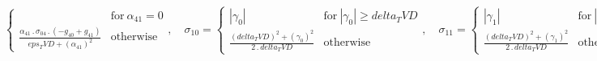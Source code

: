 \documentclass{article}
\begin{document}
\begin{dmath}
\begin{cases}
& \text{for}\: \alpha_{41} = 0 \\\frac{\alpha_{41} \,.\, \sigma_{0 4} \,.\, \left(- g_{40} + g_{41}\right)}{eps_TVD + \left(\alpha_{41} \right)^{2}} & \text{otherwise} \end{cases}, \quad \sigma_{1 0} = \begin{cases} \left|{\gamma_{0}}\right| & 
\text{for}\: \left|{\gamma_{0}}\right| \geq delta_TVD \\\frac{\left(delta_TVD \right)^{2} + \left(\gamma_{0} \right)^{2}}{2 \,.\, delta_TVD} & \text{otherwise} \end{cases}, \quad \sigma_{1 1} = \begin{cases} \left|{\gamma_{1}}\right| & \text{for}\: 
\left|{\gamma_{1}}\right| \geq delta_TVD \\\frac{\left(delta_TVD \right)^{2} + \left(\gamma_{1} \right)^{2}}{2 \,.\, delta_TVD} & \text{otherwise} \end{cases}, \quad \sigma_{1 2} = \begin{cases} \left|{\gamma_{2}}\right| & \text{for}\: 
\left|{\gamma_{2}}\right| \geq delta_TVD \\\frac{\left(delta_TVD \right)^{2} + \left(\gamma_{2} \right)^{2}}{2 \,.\, delta_TVD} & \text{otherwise} \end{cases}, \quad \sigma_{1 3} = \begin{cases} \left|{\gamma_{3}}\right| & \text{for}\: 
\left|{\gamma_{3}}\right| \geq delta_TVD \\\frac{\left(delta_TVD \right)^{2} + \left(\gamma_{3} \right)^{2}}{2 \,.\, delta_TVD} & \text{otherwise} \end{cases}, \quad \sigma_{1 4} = \begin{cases} \left|{\gamma_{4}}\right| & \text{for}\: 
\left|{\gamma_{4}}\right| \geq delta_TVD \\\frac{\left(delta_TVD \right)^{2} + \left(\gamma_{4} \right)^{2}}{2 \,.\, delta_TVD} & \text{otherwise} \end{cases}, \quad \phi_{0} = - \alpha_{01} \,.\, \left|{\sigma_{0 0} + \sigma_{1 0}}\right| + 0.5 
\,.\, \sigma_{0 0} \,.\, \left(g_{00} + g_{01}\right), \quad \phi_{1} = - \alpha_{11} \,.\, \left|{\sigma_{0 1} + \sigma_{1 1}}\right| + 0.5 \,.\, \sigma_{0 1} \,.\, \left(g_{10} + g_{11}\right), \quad \phi_{2} = - \alpha_{21} \,.\, \left|{\sigma_{0 
2} + \sigma_{1 2}}\right| + 0.5 \,.\, \sigma_{0 2} \,.\, \left(g_{20} + g_{21}\right), \quad \phi_{3} = - \alpha_{31} \,.\, \left|{\sigma_{0 3} + \sigma_{1 3}}\right| + 0.5 \,.\, \sigma_{0 3} \,.\, \left(g_{30} + g_{31}\right), \quad \phi_{4} = - 

\end{dmath}
\end{document}
